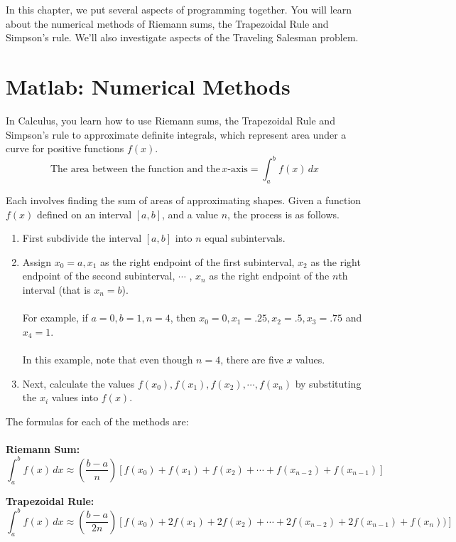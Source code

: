 
In this chapter, we put several aspects of programming together.  You will learn about the numerical methods of Riemann sums, the Trapezoidal Rule and Simpson's rule.  We'll also investigate aspects of the Traveling Salesman problem.

\section{Matlab: Numerical Methods}\label{sec:Matlab_numericalmethods}

In Calculus, you learn how to use Riemann sums, the Trapezoidal Rule and Simpson's rule to approximate definite integrals, which represent area under a curve for positive functions $f(x)$.
\[
\textrm{The area between the function and the} \, x \textrm{-axis} 
=
\int_a^b f(x) \, dx 
\]

Each involves finding the sum of areas of approximating shapes. Given a function $f(x)$ defined on an interval $[a,b]$, and a value $n$, the process is as follows.

\begin{enumerate}
\item First subdivide the interval $[a,b]$ into $n$ equal subintervals.  
\item Assign $x_0=a, x_1$ as the right endpoint of the first subinterval, $x_2$ as the right endpoint of the second subinterval, $\cdots$ , $x_n$ as the right endpoint of the $n$th interval (that is $x_n = b$).\\
\\
For example, if $a=0, b=1, n=4$, then $x_0=0, x_1=.25, x_2=.5, x_3=.75$ and $x_4=1$.\\
\\
In this example, note that even though $n=4$, there are five $x$ values.
\item Next, calculate the values $f(x_0), f(x_1), f(x_2),\cdots, f(x_n)$ by substituting the $x_i$ values into $f(x)$.
\end{enumerate}

The formulas for each of the methods are:\\
\\
\textbf{Riemann Sum:}
\[
\int_a^b f(x) \, dx
\approx
\left(\frac{b-a}{n}\right) 
\left[
f(x_0) + f(x_1) + f(x_2) + \cdots +f(x_{n-2}) + f(x_{n-1})
\right]
\]

\textbf{Trapezoidal Rule:}
\[
\int_a^b f(x) \, dx
\approx
\left(\frac{b-a}{2n}\right) 
\left[
f(x_0) + 2f(x_1) + 2f(x_2) + \cdots + 2f(x_{n-2}) + 2f(x_{n-1})+f(x_n))
\right]
\]

